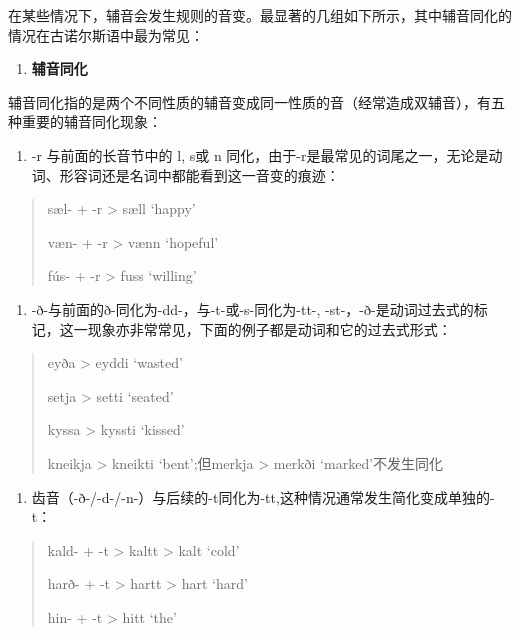 在某些情况下，辅音会发生规则的音变。最显著的几组如下所示，其中辅音同化的情况在古诺尔斯语中最为常见：

\begin{enumerate}
  \def\labelenumi{\Alph{enumi}.}
  \item
        \label{_Ref117517666}{}\textbf{辅音同化}
\end{enumerate}

辅音同化指的是两个不同性质的辅音变成同一性质的音（经常造成双辅音），有五种重要的辅音同化现象：

\begin{enumerate}
  \def\labelenumi{(\alph{enumi})}
  \item
        \label{_Ref117517668}{}-r 与前面的长音节中的 l, s或 n
        同化，由于-r是最常见的词尾之一，无论是动词、形容词还是名词中都能看到这一音变的痕迹：
\end{enumerate}

\begin{quote}
  sæl- + -r \textgreater{} sæll `happy'

  væn- + -r \textgreater{} vænn `hopeful'

  fús- + -r \textgreater{} fuss `willing'
\end{quote}

\begin{enumerate}
  \def\labelenumi{(\alph{enumi})}
  \setcounter{enumi}{1}
  \item
        -ð-与前面的ð-同化为-dd-，与-t-或-s-同化为-tt-,
        -st-，-ð-是动词过去式的标记，这一现象亦非常常见，下面的例子都是动词和它的过去式形式：
\end{enumerate}

\begin{quote}
  eyða \textgreater{} eyddi `wasted'

  setja \textgreater{} setti `seated'

  kyssa \textgreater{} kyssti `kissed'

  kneikja \textgreater{} kneikti `bent';但merkja \textgreater{} merkði
  `marked'不发生同化
\end{quote}

\begin{enumerate}
  \def\labelenumi{(\alph{enumi})}
  \setcounter{enumi}{2}
  \item
        齿音（-ð-/-d-/-n-）与后续的-t同化为-tt,这种情况通常发生简化变成单独的-t：
\end{enumerate}

\begin{quote}
  kald- + -t \textgreater{} kaltt \textgreater{} kalt `cold'

  harð- + -t \textgreater{} hartt \textgreater{} hart `hard'

  hin- + -t \textgreater{} hitt `the'
\end{quote}

